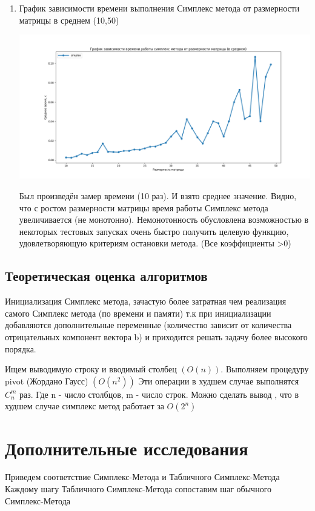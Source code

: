 \documentclass{article}
\begin{document}
\begin{enumerate}
        \item График зависимости времени выполнения Симплекс метода от размерности матрицы в среднем (10,50)
        \begin{center}
         \includegraphics[width=\textwidth]{../graphics/simplex_time_rangs_many.png}
        \end{center}
        Был произведён замер времени (10 раз). И взято среднее значение. Видно, что с ростом размерности матрицы время работы Симплекс метода увеличивается (не монотонно).
Немонотонность обусловлена возможностью в некоторых тестовых запусках очень быстро получить целевую функцию, удовлетворяющую критериям остановки метода. (Все коэффициенты >0)
    \end{enumerate}

    \subsection{Теоретическая оценка алгоритмов}
    Инициализация Симплекс метода, зачастую более затратная чем реализация самого Симплекс метода (по времени и памяти)
т.к при инициализации добавляются дополнительные переменные (количество зависит от количества отрицательных компонент
вектора b) и приходится решать задачу более высокого порядка.

    Ищем выводимую строку и вводимый столбец $(O(n))$.
    Выполняем процедуру pivot (Жордано Гаусс) $(O(n^2))$
    Эти операции в худшем случае выполнятся $C^m_n$ раз. Где n - число столбцов, m - число строк.
    Можно сделать вывод , что в худшем случае симплекс метод работает за $O(2^n)$

    \section{Дополнительные исследования}

    Приведем соответствие Симплекс-Метода и Табличного Симплекс-Метода\\
    Каждому шагу Табличного Симплекс-Метода сопоставим шаг обычного Симплекс-Метода\\
\end{document}

